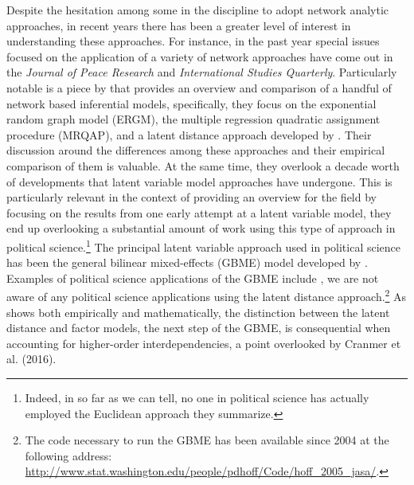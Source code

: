 Despite the hesitation among some in the discipline to adopt network analytic approaches, in recent years there has been a greater level of interest in understanding these approaches. For instance, in the past year special issues focused on the application of a variety of network approaches have come out in the \textit{Journal of Peace Research} and \textit{International Studies Quarterly}. Particularly notable is a piece by \citet{cranmer:etal:2016} that provides an overview and comparison of a handful of network based inferential models, specifically, they focus on the exponential random graph model (ERGM), the multiple regression quadratic assignment procedure (MRQAP), and a latent distance approach developed by \citet{hoff:etal:2002}. Their discussion around the differences among these approaches and their empirical comparison of them is  valuable. At the same time, they overlook a decade worth of developments that latent variable model approaches have undergone. This is particularly relevant in the context of providing an overview for the field by focusing on the results from one early attempt at a latent variable model, they end up overlooking a substantial amount of work using this type of approach in political science.\footnote{Indeed, in so far as we can tell, no one in political science has actually employed the Euclidean approach they summarize.} The principal latent variable approach used in political science has been the general bilinear mixed-effects (GBME) model developed by \citet{hoff:2005}. Examples of political science applications of the GBME include \citet{hoff:ward:2004,ward:etal:2007,cao:2009,can:2010, can:2012,breunig:2012,ward:etal:2012,can:ward:2014.metternich:etal:2015,green hill:2015}, we are not aware of any political science applications using the latent distance approach.\footnote{The code necessary to run the GBME has been available since 2004 at the following address: \url{http://www.stat.washington.edu/people/pdhoff/Code/hoff_2005_jasa/}.} As \citet{hoff:2008} shows both empirically and mathematically, the distinction between the latent distance and factor models, the next step of the GBME, is consequential when accounting for higher-order interdependencies, a point overlooked by Cranmer et al. (2016).

